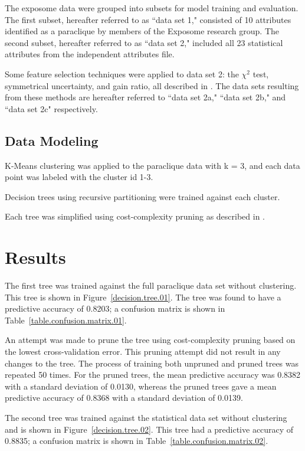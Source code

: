 \documentclass[conference,compsoc]{IEEEtran}
\begin{document}
The exposome data were grouped into subsets for model training and evaluation. The first subset, hereafter referred to as ``data set 1,"
consisted of 10 attributes identified as a paraclique by members of the Exposome research group. The second subset, hereafter referred to as ``data set 2,"
included all 23 statistical attributes from the independent attributes file.

Some feature selection techniques were applied to data set 2: the ${\chi}^2$ test, symmetrical uncertainty, and gain ratio, 
all described in \cite{fselector}. The data sets resulting
from these methods are hereafter referred to ``data set 2a," ``data set 2b," and ``data set 2c" respectively.

\subsection{Data Modeling}

K-Means clustering \cite{hartigan} was applied to the paraclique data with k = 3, and each data point was labeled with the cluster id 1-3.

Decision trees using recursive partitioning \cite{rpart} were trained against each cluster.

Each tree was simplified using cost-complexity pruning as described in \cite{quinlan}.

\section{Results}

The first tree was trained against the full paraclique data set without clustering. This tree is shown in Figure~\ref{decision.tree.01}.
The tree was found to have a predictive accuracy of 0.8203; a confusion matrix is shown in Table~\ref{table.confusion.matrix.01}.

An attempt was made to prune the tree using cost-complexity pruning based on the lowest cross-validation error. This pruning attempt did not result in
any changes to the tree. The process of training both unpruned and pruned trees was repeated 50 times. For the pruned trees, 
the mean predictive accuracy was 0.8382 with a standard deviation of 0.0130, whereas
the pruned trees gave a mean predictive accuracy of 0.8368 with a standard deviation of 0.0139.

The second tree was trained against the statistical data set without clustering and is shown in Figure~\ref{decision.tree.02}. This tree
had a predictive accuracy of 0.8835; a confusion matrix is shown in Table~\ref{table.confusion.matrix.02}.
\end{document}
